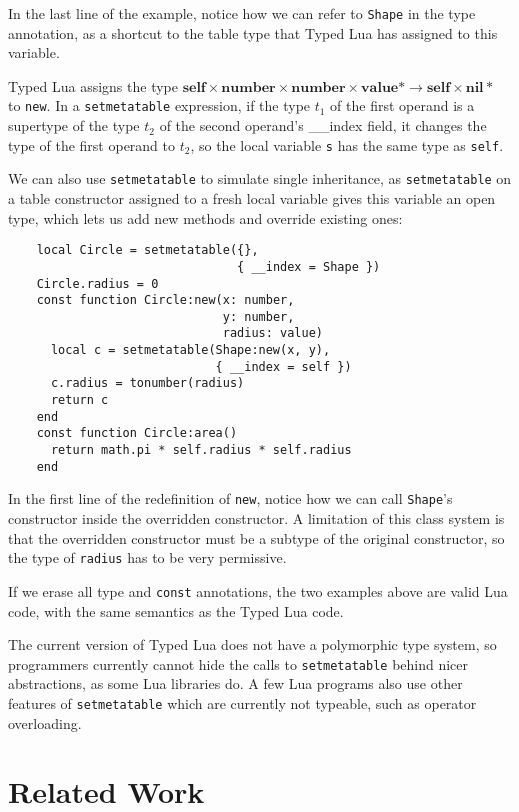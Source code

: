 \documentclass{sig-alternate}
\newcommand{\Top}{\mathbf{value}}
\newcommand{\Nil}{\mathbf{nil}}
\newcommand{\Number}{\mathbf{number}}
\newcommand{\Self}{\mathbf{self}}
\begin{document}
In the last line of the example, notice how we can refer
to {\tt Shape} in the type annotation, as a shortcut
to the table type that Typed Lua has assigned
to this variable.

Typed Lua assigns the type
$\Self \times \Number \times \Number \times
\Top* \rightarrow \Self \times \Nil*$ to
{\tt new}. In a {\tt setmetatable} expression,
if the type $t_1$ of the first operand is a supertype
of the type $t_2$ of the second operand's {\_\_index} field,
it changes the type of the first operand to $t_2$, 
so the local variable {\tt s} 
has the same type as {\tt self}.

We can also use {\tt setmetatable} to simulate single
inheritance, as {\tt setmetatable} on a table constructor
assigned to a fresh local variable gives this variable
an open type, which lets us add new methods and override
existing ones:

\begin{verbatim}
    local Circle = setmetatable({},
                                { __index = Shape })
    Circle.radius = 0
    const function Circle:new(x: number,
                              y: number,
                              radius: value)
      local c = setmetatable(Shape:new(x, y),
                             { __index = self })
      c.radius = tonumber(radius)
      return c
    end
    const function Circle:area()
      return math.pi * self.radius * self.radius
    end
\end{verbatim} 

In the first line of the redefinition of {\tt new},
notice how we can call {\tt Shape}'s constructor inside
the overridden constructor. A limitation of this class
system is that the overridden constructor must be a
subtype of the original constructor, so the type of
{\tt radius} has to be very permissive.

If we erase all type and {\tt const} annotations, the
two examples above are valid Lua code, with the same
semantics as the Typed Lua code.

The current version of Typed Lua does not have a polymorphic
type system, so programmers currently cannot hide the
calls to {\tt setmetatable} behind nicer abstractions, as
some Lua libraries do. A few Lua programs also use
other features of {\tt setmetatable} which are currently
not typeable, such as operator overloading.

\section{Related Work}
\label{sec:review}
\end{document}
